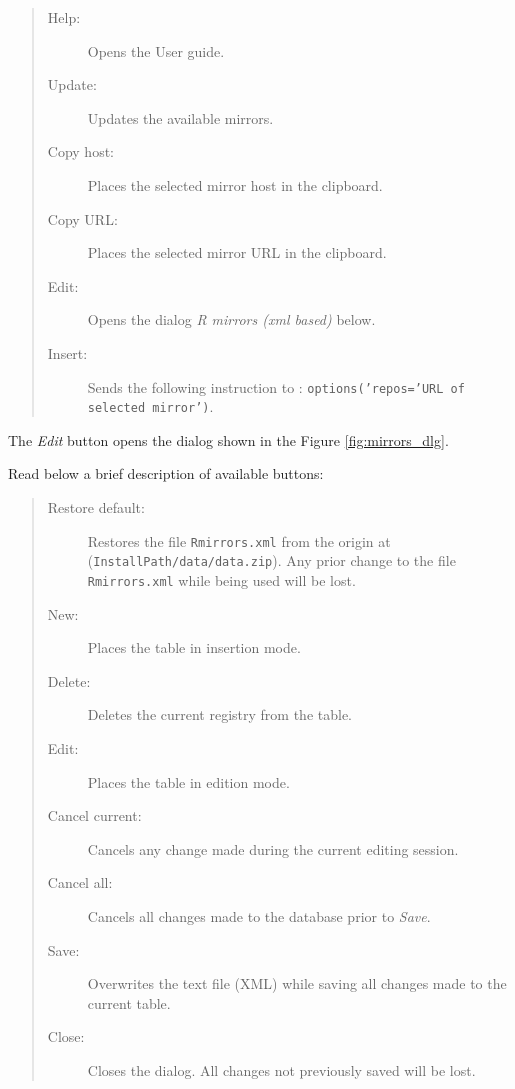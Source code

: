 \begin{quote}
  \begin{footnotesize}
    \begin{description}
      \item[Help:]
        Opens the User guide.
      \item[Update:]
        Updates the available \RR{} mirrors.
      \item[Copy host:]
        Places the selected mirror host in the clipboard.
      \item[Copy URL:]
        Places the selected mirror URL in the clipboard.
      \item[Edit:]
        Opens the dialog \textit{R mirrors (xml based)} below.
      \item[Insert:]
        Sends the following instruction to \RR{}: \texttt{options('repos='URL of selected mirror')}.
    \end{description}
  \end{footnotesize}
\end{quote}

The \textit{Edit} button opens the dialog shown in the Figure \ref{fig:mirrors_dlg}.

Read below a brief description of available buttons:

\begin{quote}
  \begin{footnotesize}
    \begin{description}
      \item[Restore default:]
        Restores the file \texttt{Rmirrors.xml} from the origin at
        (\texttt{InstallPath/data/data.zip}). Any prior change to the
        file \texttt{Rmirrors.xml} while being used will be lost.
      \item[New:]
        Places the table in insertion mode.
      \item[Delete:]
        Deletes the current registry from the table.
      \item[Edit:]
        Places the table in edition mode.
      \item[Cancel current:]
        Cancels any change made during the current editing session.
      \item[Cancel all:]
        Cancels all changes made to the database prior to \textit{Save}.
      \item[Save:]
        Overwrites the text file (XML) while saving all changes made to the current table.
      \item[Close:]
        Closes the dialog. All changes not previously saved will be lost.
    \end{description}
  \end{footnotesize}
\end{quote}
